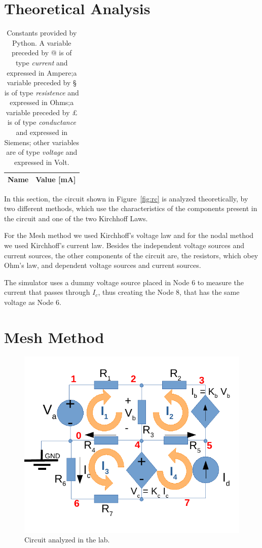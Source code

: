 \section{Theoretical Analysis}
\label{sec:analysis}

\begin{table}[!h]
  \centering
  \begin{tabular}{|l|r|}
    \hline    
    {\bf Name} & {\bf Value [mA]} \\ \hline
    
  \end{tabular}
  \caption{Constants provided by Python. A variable preceded by @ is of type {\em current}
    and expressed in Ampere;a variable preceded by § is of type {\it resistence} and expressed in
    Ohms;a variable preceded by £ is of type {\it conductance} and expressed in
    Siemens; other variables are of type {\it voltage} and expressed in
    Volt.}
  \label{tab:op}
\end{table}

In this section, the circuit shown in Figure~\ref{fig:rc} is analyzed
theoretically, by two different methods, which use the characteristics of the components present in the circuit and one of the two Kirchhoff Laws.

For the Mesh method we used Kirchhoff's voltage law and for the nodal method we used Kirchhoff's current law.
Besides the independent voltage sources and current sources, the other components of the circuit are, the resistors, which obey Ohm's law, and dependent voltage sources and current sources.

The simulator uses a dummy voltage source placed in Node 6 to measure the current that passes through $I_c$, thus creating the Node 8, that has the same voltage as Node 6.

\section{Mesh Method}

\begin{figure}[h] \centering
\includegraphics[width=0.6\linewidth]{mesh_diagram.pdf}
\caption{Circuit analyzed in the lab.}
\label{fig:rc1}
\end{figure}


